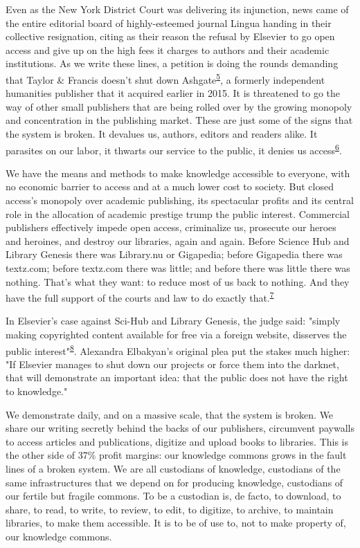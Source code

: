 \documentclass[11pt,a4paper]{article}
\begin{document}
Even as the New York District Court was delivering its injunction, news
came of the entire editorial board of highly-esteemed journal Lingua
handing in their collective resignation, citing as their reason the
refusal by Elsevier to go open access and give up on the high fees it
charges to authors and their academic institutions. As we write these
lines, a petition is doing the rounds demanding that Taylor \& Francis
doesn't shut down Ashgate\textsuperscript{\protect\hyperlink{fn-5}{5}},
a formerly independent humanities publisher that it acquired earlier in
2015. It is threatened to go the way of other small publishers that are
being rolled over by the growing monopoly and concentration in the
publishing market. These are just some of the signs that the system is
broken. It devalues us, authors, editors and readers alike. It parasites
on our labor, it thwarts our service to the public, it denies us
access\textsuperscript{\protect\hyperlink{fn-6}{6}}.

We have the means and methods to make knowledge accessible to everyone,
with no economic barrier to access and at a much lower cost to society.
But closed access's monopoly over academic publishing, its spectacular
profits and its central role in the allocation of academic prestige
trump the public interest. Commercial publishers effectively impede open
access, criminalize us, prosecute our heroes and heroines, and destroy
our libraries, again and again. Before Science Hub and Library Genesis
there was Library.nu or Gigapedia; before Gigapedia there was textz.com;
before textz.com there was little; and before there was little there was
nothing. That's what they want: to reduce most of us back to nothing.
And they have the full support of the courts and law to do exactly
that.\textsuperscript{\protect\hyperlink{fn-7}{7}}

In Elsevier's case against Sci-Hub and Library Genesis, the judge said:
{"simply making copyrighted content available for free via a foreign
website, disserves the public
interest"}\textsuperscript{\protect\hyperlink{fn-8}{8}}. Alexandra
Elbakyan's original plea put the stakes much higher: {"If Elsevier
manages to shut down our projects or force them into the darknet, that
will demonstrate an important idea: that the public does not have the
right to knowledge."}

We demonstrate daily, and on a massive scale, that the system is broken.
We share our writing secretly behind the backs of our publishers,
circumvent paywalls to access articles and publications, digitize and
upload books to libraries. This is the other side of 37\% profit
margins: our knowledge commons grows in the fault lines of a broken
system. We are all custodians of knowledge, custodians of the same
infrastructures that we depend on for producing knowledge, custodians of
our fertile but fragile commons. To be a custodian is, de facto, to
download, to share, to read, to write, to review, to edit, to digitize,
to archive, to maintain libraries, to make them accessible. It is to be
of use to, not to make property of, our knowledge commons.
\end{document}
